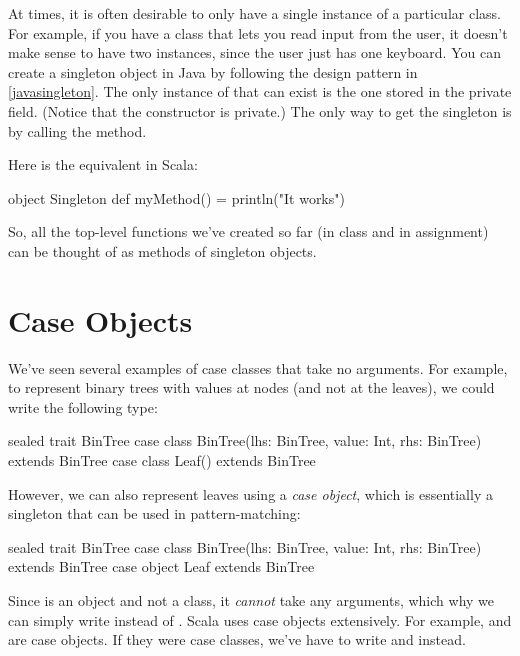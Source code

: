 \documentclass{book}
\begin{document}
At times, it is often desirable to only have a single instance of a particular
class. For example, if you have a class that lets you read input from the
user, it doesn't make sense to have two instances, since the user just has
one keyboard. You can create a singleton object in Java by following the
design pattern in \cref{javasingleton}. The only instance of 
that can exist is the one stored in the private field. (Notice that the constructor
is private.) The only way to get
the singleton is by calling the  method.

Here is the equivalent in Scala:

\begin{scalacode}
object Singleton {
  def myMethod() = println("It works")
}
\end{scalacode}

So, all the top-level functions we've created so far (in class and in
assignment) can be thought of as methods of singleton objects.

\section{Case Objects}

We've seen several examples of case classes that take no arguments. For example,
to represent binary trees with values at nodes (and not at the leaves), we could
write the following type:
%
\begin{scalacode}
sealed trait BinTree
case class BinTree(lhs: BinTree, value: Int, rhs: BinTree) extends BinTree
case class Leaf() extends BinTree
\end{scalacode}

However, we can also represent leaves using a \emph{case object}, which is essentially
a singleton that can be used in pattern-matching:
%
\begin{scalacode}
sealed trait BinTree
case class BinTree(lhs: BinTree, value: Int, rhs: BinTree) extends BinTree
case object Leaf extends BinTree
\end{scalacode}

Since  is an object and not a class, it \emph{cannot}
take any arguments, which why we can simply write  instead
of . Scala uses case objects extensively. For example,
 and  are case objects. If they
were case classes, we've have to write  and
 instead.
\end{document}
